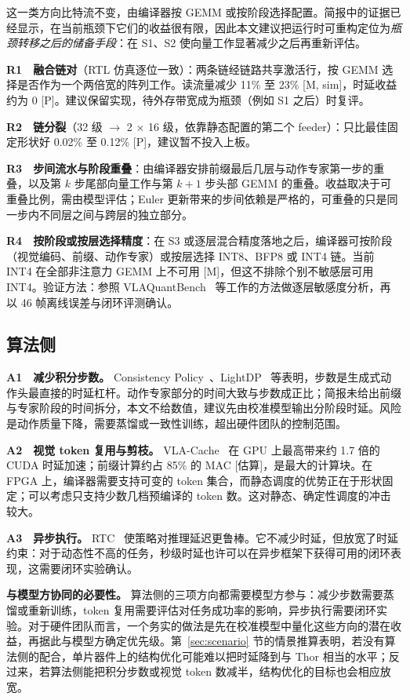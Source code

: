 \documentclass[a4paper,10.5pt]{ctexart}
\newcommand{\tM}{\textsf{[M]}}              %
\newcommand{\tP}{\textsf{[P]}}              %
\newcommand{\tMsim}{\textsf{[M, sim]}}      %
\newcommand{\tE}{\textsf{[估算]}}           %
\begin{document}
这一类方向比特流不变，由编译器按 GEMM 或按阶段选择配置。简报中的证据已经显示，在当前瓶颈下它们的收益很有限，因此本文建议把运行时可重构定位为\emph{瓶颈转移之后的储备手段}：在 S1、S2 使向量工作显著减少之后再重新评估。

\textbf{R1　融合链对}（RTL 仿真逐位一致）：两条链经链路共享激活行，按 GEMM 选择是否作为一个两倍宽的阵列工作。读流量减少 11\% 至 23\% \tMsim，时延收益约为 0 \tP。建议保留实现，待外存带宽成为瓶颈（例如 S1 之后）时复评。

\textbf{R2　链分裂}（32 级 $\to$ 2 $\times$ 16 级，依靠静态配置的第二个 feeder）：只比最佳固定形状好 0.02\% 至 0.12\% \tP，建议暂不投入上板。

\textbf{R3　步间流水与阶段重叠}：由编译器安排前缀最后几层与动作专家第一步的重叠，以及第 $k$ 步尾部向量工作与第 $k+1$ 步头部 GEMM 的重叠。收益取决于可重叠比例，需由模型评估；Euler 更新带来的步间依赖是严格的，可重叠的只是同一步内不同层之间与跨层的独立部分。

\textbf{R4　按阶段或按层选择精度}：在 S3 或逐层混合精度落地之后，编译器可按阶段（视觉编码、前缀、动作专家）或按层选择 INT8、BFP8 或 INT4 链。当前 INT4 在全部非注意力 GEMM 上不可用 \tM，但这不排除个别不敏感层可用 INT4。验证方法：参照 VLAQuantBench~\cite{vlaquantbench} 等工作的方法做逐层敏感度分析，再以 46 帧离线误差与闭环评测确认。

\subsection{算法侧}

\textbf{A1　减少积分步数。} Consistency Policy~\cite{consistencypolicy}、LightDP~\cite{lightdp} 等表明，步数是生成式动作头最直接的时延杠杆。动作专家部分的时间大致与步数成正比；简报未给出前缀与专家阶段的时间拆分，本文不给数值，建议先由校准模型输出分阶段时延。风险是动作质量下降，需要蒸馏或一致性训练，超出硬件团队的控制范围。

\textbf{A2　视觉 token 复用与剪枝。} VLA-Cache~\cite{vlacache} 在 GPU 上最高带来约 1.7 倍的 CUDA 时延加速；前缀计算约占 85\% 的 MAC \tE，是最大的计算块。在 FPGA 上，编译器需要支持可变的 token 集合，而静态调度的优势正在于形状固定；可以考虑只支持少数几档预编译的 token 数。这对静态、确定性调度的冲击较大。

\textbf{A3　异步执行。} RTC~\cite{rtc} 使策略对推理延迟更鲁棒。它不减少时延，但放宽了时延约束：对于动态性不高的任务，秒级时延也许可以在异步框架下获得可用的闭环表现，这需要闭环实验确认。

\textbf{与模型方协同的必要性。} 算法侧的三项方向都需要模型方参与：减少步数需要蒸馏或重新训练，token 复用需要评估对任务成功率的影响，异步执行需要闭环实验。对于硬件团队而言，一个务实的做法是先在校准模型中量化这些方向的潜在收益，再据此与模型方确定优先级。第~\ref{sec:scenario} 节的情景推算表明，若没有算法侧的配合，单片器件上的结构优化可能难以把时延降到与 Thor 相当的水平；反过来，若算法侧能把积分步数或视觉 token 数减半，结构优化的目标也会相应放宽。
\end{document}
